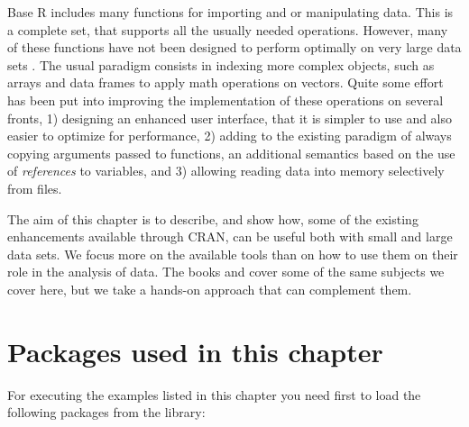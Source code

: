 \documentclass[krantz2,ChapterTOCs]{krantz}\usepackage{knitr}
\begin{document}
Base R includes many functions for importing and or manipulating data. This is a complete set, that supports all the usually needed operations. However, many of these functions have not been designed to perform optimally on very large data sets \autocite[see][]{Matloff2011}. The usual paradigm consists in indexing more complex objects, such as arrays and data frames to apply math operations on vectors. Quite some effort has been put into improving the implementation of these operations on several fronts, 1) designing an enhanced user interface, that it is simpler to use and also easier to optimize for performance, 2) adding to the existing paradigm of always copying arguments passed to functions, an additional semantics based on the use of \emph{references} to variables, and 3) allowing reading data into memory selectively from files.

The aim of this chapter is to describe, and show how, some of the existing enhancements available through CRAN, can be useful both with small and large data sets. We focus more on the available tools than on how to use them on their role in the analysis of data. The books  \autocite{Wickham2017} and  \autocite{Peng2016} cover some of the same subjects we cover here, but we take a hands-on approach that can complement them.

\section{Packages used in this chapter}

\begin{knitrout}\footnotesize
{}\color{fgcolor}\begin{kframe}
\begin{alltt}
\hlopt{::}
\end{alltt}
\end{kframe}
\end{knitrout}

For executing the examples listed in this chapter you need first to load the following packages from the library:

\begin{knitrout}\footnotesize
{}\color{fgcolor}\begin{kframe}
\begin{alltt}
\end{alltt}
\end{kframe}
\end{knitrout}
\end{document}
